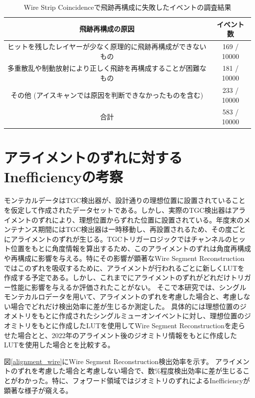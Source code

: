 \begin{table}[]
  \centering
  \caption{Wire Strip Coincidenceで飛跡再構成に失敗したイベントの調査結果}
  \label{tab:eyscan}
  \begin{tabular}{|c|c|}
  \hline
  飛跡再構成の原因                        & イベント数       \\ \hline\hline
  ヒットを残したレイヤーが少なく原理的に飛跡再構成ができないもの & 169 / 10000 \\ \hline
  多重散乱や制動放射により正しく飛跡を再構成することが困難なもの & 181 / 10000 \\ \hline
  その他 (アイスキャンでは原因を判断できなかったものを含む)  & 233 / 10000 \\ \hline
  合計                              & 583 / 10000 \\ \hline
  \end{tabular}
\end{table}


\section{アライメントのずれに対するInefficiencyの考察}
モンテカルデータはTGC検出器が、設計通りの理想位置に設置されていることを仮定して作成されたデータセットである。しかし、実際のTGC検出器はアライメントのずれにより、理想位置からずれた位置に設置されている。年度末のメンテナンス期間にはTGC検出器は一時移動し、再設置されるため、その度ごとにアライメントのずれが生じる。TGCトリガーロジックではチャンネルのヒット位置をもとに角度情報を算出するため、このアライメントのずれは角度再構成や\pt 再構成に影響を与える。特にその影響が顕著なWire Segment Reconstructionではこのずれを吸収するために、アライメントが行われるごとに新しくLUTを作成する予定である。しかし、これまでにアライメントのずれがどれだけトリガー性能に影響を与えるか評価されたことがない。
そこで本研究では、シングルモンテカルロデータを用いて、アライメントのずれを考慮した場合と、考慮しない場合でどれだけ検出効率に差が生じるか測定した。
具体的には理想位置のジオメトリをもとに作成されたシングルミューオンイベントに対し、理想位置のジオミトリをもとに作成したLUTを使用してWire Segment Reconstructionを走らせた場合とと、2022年のアライメント後のジオミトリ情報をもとに作成したLUTを使用した場合とを比較する。

図\ref{alignment_wire}にWire Segment Reconstruction検出効率を示す。
アライメントのずれを考慮した場合と考慮しない場合で、数\%程度検出効率に差が生じることがわかった。特に、フォワード領域ではジオミトリのずれによるInefficiencyが顕著な様子が窺える。

